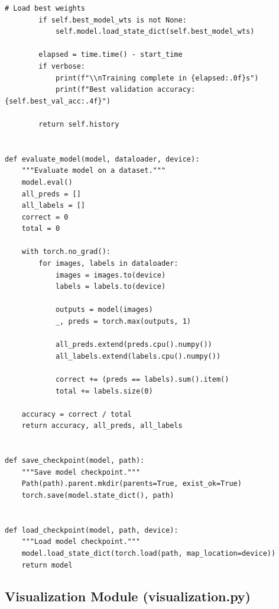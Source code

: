 \documentclass[man,12pt,letterpaper,donotrepeattitle,floatsintext]{apa7}
\begin{document}
\begin{lstlisting}[style=pythonstyle]
        # Load best weights
        if self.best_model_wts is not None:
            self.model.load_state_dict(self.best_model_wts)
        
        elapsed = time.time() - start_time
        if verbose:
            print(f"\\nTraining complete in {elapsed:.0f}s")
            print(f"Best validation accuracy: {self.best_val_acc:.4f}")
        
        return self.history


def evaluate_model(model, dataloader, device):
    """Evaluate model on a dataset."""
    model.eval()
    all_preds = []
    all_labels = []
    correct = 0
    total = 0
    
    with torch.no_grad():
        for images, labels in dataloader:
            images = images.to(device)
            labels = labels.to(device)
            
            outputs = model(images)
            _, preds = torch.max(outputs, 1)
            
            all_preds.extend(preds.cpu().numpy())
            all_labels.extend(labels.cpu().numpy())
            
            correct += (preds == labels).sum().item()
            total += labels.size(0)
    
    accuracy = correct / total
    return accuracy, all_preds, all_labels


def save_checkpoint(model, path):
    """Save model checkpoint."""
    Path(path).parent.mkdir(parents=True, exist_ok=True)
    torch.save(model.state_dict(), path)


def load_checkpoint(model, path, device):
    """Load model checkpoint."""
    model.load_state_dict(torch.load(path, map_location=device))
    return model
\end{lstlisting}

\subsection{Visualization Module (visualization.py)}
\end{document}
